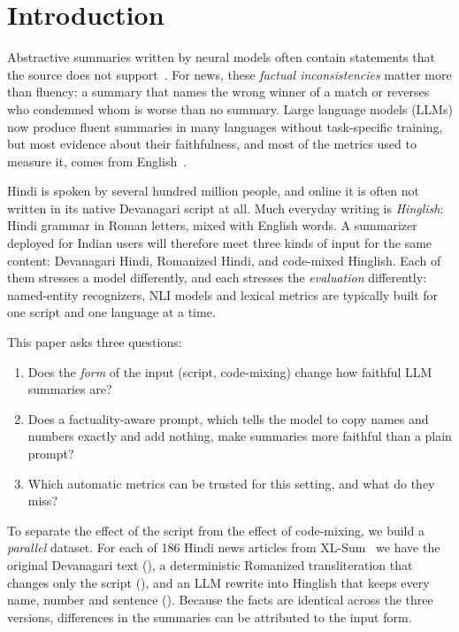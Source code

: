 \section{Introduction}

Abstractive summaries written by neural models often contain statements that the source does not support~\cite{maynez2020faithfulness,ji2023survey}. For news, these \emph{factual inconsistencies} matter more than fluency: a summary that names the wrong winner of a match or reverses who condemned whom is worse than no summary. Large language models (LLMs) now produce fluent summaries in many languages without task-specific training, but most evidence about their faithfulness, and most of the metrics used to measure it, comes from English~\cite{pagnoni2021frank,honovich2022true}.

Hindi is spoken by several hundred million people, and online it is often not written in its native Devanagari script at all. Much everyday writing is \emph{Hinglish}: Hindi grammar in Roman letters, mixed with English words. A summarizer deployed for Indian users will therefore meet three kinds of input for the same content: Devanagari Hindi, Romanized Hindi, and code-mixed Hinglish. Each of them stresses a model differently, and each stresses the \emph{evaluation} differently: named-entity recognizers, NLI models and lexical metrics are typically built for one script and one language at a time.

This paper asks three questions:
\begin{enumerate}
  \item Does the \emph{form} of the input (script, code-mixing) change how faithful LLM summaries are?
  \item Does a factuality-aware prompt, which tells the model to copy names and numbers exactly and add nothing, make summaries more faithful than a plain prompt?
  \item Which automatic metrics can be trusted for this setting, and what do they miss?
\end{enumerate}

To separate the effect of the script from the effect of code-mixing, we build a \emph{parallel} dataset. For each of 186 Hindi news articles from XL-Sum~\cite{hasan2021xlsum} we have the original Devanagari text (), a deterministic Romanized transliteration that changes only the script (), and an LLM rewrite into Hinglish that keeps every name, number and sentence (). Because the facts are identical across the three versions, differences in the summaries can be attributed to the input form.

